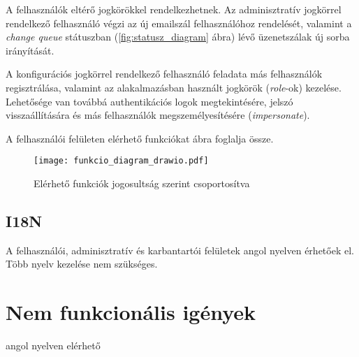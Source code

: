 A felhasználók eltérő jogkörökkel rendelkezhetnek. Az adminisztratív jogkörrel rendelkező felhasználó végzi az új emailszál felhasználóhoz rendelését, valamint a \foreignlanguage{british}{\textit{change queue}} státuszban (\ref{fig:statusz_diagram} ábra) lévő üzenetszálak új sorba irányítását.

A konfigurációs jogkörrel rendelkező felhasználó feladata más felhasználók regisztrálása, valamint az alakalmazásban használt jogkörök (\foreignlanguage{british}{\textit{role}}-ok) kezelése. Lehetősége van továbbá authentikációs logok megtekintésére, jelszó visszaállítására és más felhasználók megszemélyesítésére (\foreignlanguage{british}{\textit{impersonate}}).

A felhasználói felületen elérhető funkciókat  ábra foglalja össze.

\begin{figure}[hbt] 
	\caption{Elérhető funkciók jogosultság szerint csoportosítva}
	\centering
	\texttt{[image: funkcio\_diagram\_drawio.pdf]}\label{fig:funkcio_diagram}
\end{figure}



\subsection{I18N}
A felhasználói, adminisztratív és karbantartói felületek angol nyelven érhetőek el. Több nyelv kezelése nem szükséges.


\section{Nem funkcionális igények}	
\lipsum


angol nyelven elérhető